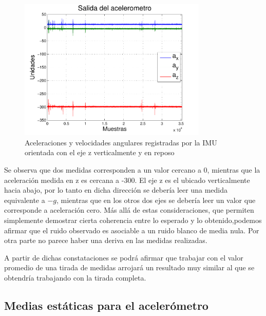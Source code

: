 \documentclass[spanish,12pt,a4paper,titlepage]{report}
\begin{document}
\begin{figure}[h!]
  \begin{center}
    \includegraphics[width=0.8\textwidth]{./pics/1hora.pdf}
  \end{center}
  \vspace{-20pt}
  \caption{Aceleraciones y velocidades angulares registradas por la IMU orientada con el eje z verticalmente y en reposo}
  \label{fig:1hora}
\end{figure}

Se observa que dos medidas corresponden a un valor cercano a 0, mientras que la aceleración medida en z es cercana a -300. El eje z es el ubicado verticalmente hacia abajo, por lo tanto en dicha dirección se debería leer una medida equivalente a $-g$, mientras que en los otros dos ejes se debería leer un valor que corresponde a aceleración cero. Más allá de estas consideraciones, que permiten simplemente demostrar cierta coherencia entre lo esperado y lo obtenido,podemos afirmar que el ruido observado es asociable a un ruido blanco de media nula. Por otra parte no parece haber una deriva en las medidas realizadas. 

A partir de dichas constataciones se podrá afirmar que trabajar con el valor promedio de una tirada de medidas arrojará un resultado muy similar al que se obtendría trabajando con la tirada completa. 


\subsection{Medias estáticas para el acelerómetro}
\end{document}
